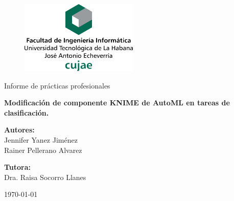 \begin{figure}
	\centering
	\includegraphics[width=0.5\textwidth]{figuras/membrete-cujae-centrado.png}
\end{figure}

	\begin{center}
		
	\vspace{2cm}

	
	
	\large{Informe de prácticas profesionales}

	\vspace{3cm}
	

	\LARGE{\textbf{Modificación de componente KNIME de AutoML en tareas de clasificación.}}
	
	
	
	\vspace{2cm}
	
	\large{
	\textbf{Autores:} \\
	Jennifer Yanez Jiménez\\
	Rainer Pellerano Alvarez\\
	\vspace{1.5cm}
	
	\textbf{Tutora:}\\
	Dra. Raisa Socorro Llanes\\
	}
	
	\vspace{2cm}
	
	{\mifecha\today}
	
\end{center}	


